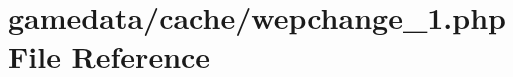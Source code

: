 \hypertarget{cache_2wepchange__1_8php}{\section{gamedata/cache/wepchange\+\_\+1.php File Reference}
\label{cache_2wepchange__1_8php}
}
